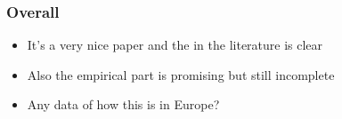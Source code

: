 \documentclass[xcolor=dvipsnames,handout]{beamer}
\begin{document}
\begin{frame}[t]\frametitle {\textbf{Overall}} \label{conclusion}
\begin{itemize}
\item It's a very nice paper and the {\color{blue}{contribution}} in the literature is clear
\item Also the empirical part is promising but still incomplete
\item Any data of how this is in Europe?

\end{itemize}
\end{frame}
\end{document}

